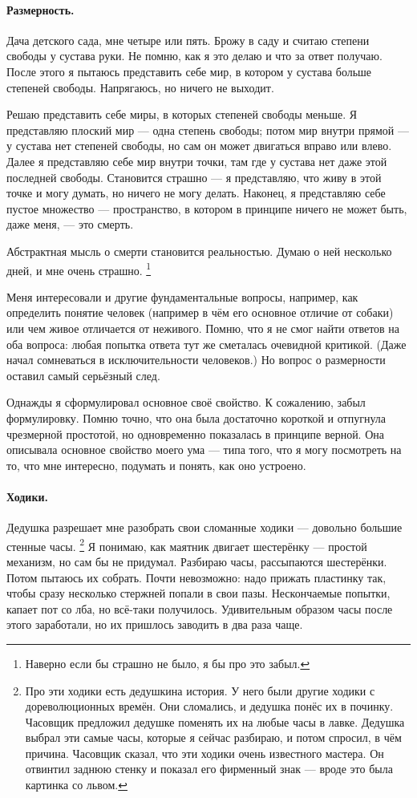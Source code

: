 \documentclass{book}
\begin{document}
\paragraph{Размерность.}
Дача детского сада, мне четыре или пять.
Брожу в саду и считаю степени свободы у сустава руки.
Не помню, как я это делаю и что за ответ получаю.
После этого я пытаюсь представить себе мир, в котором у сустава больше степеней свободы.
Напрягаюсь, но ничего не выходит.

Решаю представить себе миры, в которых степеней свободы меньше.
Я представляю плоский мир --- одна степень свободы;
потом мир внутри прямой --- у сустава нет степеней свободы, но сам он может двигаться вправо или влево.
Далее я представляю себе мир внутри точки, там где у сустава нет даже этой последней свободы.
Становится страшно --- я представляю, что живу в этой точке и могу думать, но ничего не могу делать.
Наконец, я представляю себе пустое множество --- пространство, в котором в принципе ничего не может быть, даже меня, --- это смерть.

Абстрактная мысль о смерти становится реальностью. 
Думаю о ней несколько дней, и мне очень страшно.%
\footnote{Наверно если бы страшно не было, я бы про это забыл.}

Меня интересовали и другие фундаментальные вопросы,
например, как определить понятие человек (например в чём его основное отличие от собаки)
или чем живое отличается от неживого.
Помню, что я не смог найти ответов на оба вопроса: любая попытка ответа тут же сметалась очевидной критикой.
(Даже начал сомневаться в исключительности человеков.)
Но вопрос о размерности оставил самый серьёзный след.

Однажды я сформулировал основное своё свойство.
К сожалению, забыл формулировку.
Помню точно, что она была достаточно короткой и отпугнула чрезмерной простотой, но одновременно показалась в принципе верной.
Она описывала основное свойство моего ума --- типа  того, что я могу посмотреть на то, что мне интересно, подумать и понять, как оно устроено.

\paragraph{Ходики.}
Дедушка разрешает мне разобрать свои сломанные ходики ---
довольно большие стенные часы.%
\footnote{\label{khodiki}Про эти ходики есть дедушкина история.
У него были другие ходики с дореволюционных времён.
Они сломались, и дедушка понёс их в починку.
Часовщик предложил дедушке поменять их на любые часы в лавке.
Дедушка выбрал эти самые часы, которые я сейчас разбираю,
и потом спросил, в чём причина.
Часовщик сказал, что эти ходики очень известного мастера.
Он отвинтил заднюю стенку и показал его фирменный знак ---
вроде это была картинка со львом.}
Я понимаю, как маятник двигает шестерёнку
--- простой механизм, но сам бы не придумал.
Разбираю часы,
рассыпаются шестерёнки.
Потом пытаюсь их собрать.
Почти невозможно: надо прижать пластинку так,
чтобы сразу несколько стержней попали в свои пазы.
Нескончаемые попытки,
капает пот со лба,
но всё-таки получилось.
Удивительным образом часы после этого заработали,
но их пришлось заводить в два раза чаще.
\end{document}

